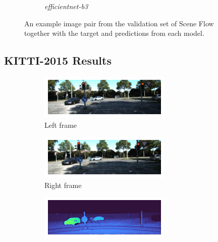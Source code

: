 \documentclass[runningheads]{llncs}
\begin{document}
\begin{figure}[t]
\begin{subfigure}[h]{0.32\linewidth}
         \caption{\textit{efficientnet-b3}}
     \end{subfigure}
     \caption{An example image pair from the validation set of Scene Flow together with the target and predictions from each model. \label{Fig:Pretrain_Examples}}
\end{figure}


\subsection{KITTI-2015 Results}
\begin{figure}[h]
     \centering
     \begin{subfigure}[h]{0.32\linewidth}
         \centering
        \includegraphics[width=\linewidth]{images/left_image_kitti.png}
        \caption{Left frame}
     \end{subfigure}
     \hfill
     \begin{subfigure}[h]{0.32\linewidth}
         \centering
        \includegraphics[width=\linewidth]{images/right_image_kitti.png}
        \caption{Right frame}
     \end{subfigure}
     \hfill
     \begin{subfigure}[h]{0.32\linewidth}
         \centering
        \includegraphics[width=\linewidth]{images/gt_kitti.png}

\end{subfigure}
\end{figure}
\end{document}
